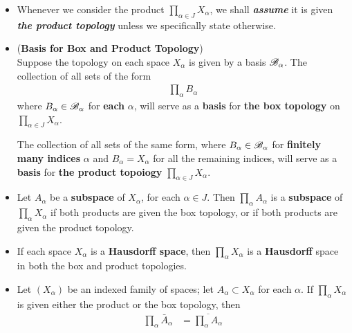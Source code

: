 \documentclass[11pt]{article}
\begin{document}
\begin{itemize}
\item \begin{remark}
Whenever we consider the product $\prod_{\alpha \in J} X_{\alpha}$, we shall \emph{\textbf{assume}} it is given \emph{\textbf{the product topology}} unless we specifically state otherwise.
\end{remark}

\item \begin{proposition} (\textbf{Basis for Box and Product Topology})\\
Suppose the topology on each space $X_{\alpha}$ is given by a basis  ${\mathscr B}_{\alpha}$. The collection of all sets of the form
\begin{align*}
\prod_{\alpha}B_{\alpha}
\end{align*}
where $B_{\alpha} \in {\mathscr B}_{\alpha}$ for \textbf{each} $\alpha$, will serve as a \textbf{basis} for \textbf{the box topology} on $\prod_{\alpha \in J} X_{\alpha}$.

The collection of all sets of the same form, where $B_{\alpha} \in {\mathscr B}_{\alpha}$ for \textbf{finitely many indices} $\alpha$ and $B_{\alpha} = X_{\alpha}$ for all the remaining indices, will serve as a \textbf{basis} for \textbf{the product topoiogy} $\prod_{\alpha \in J} X_{\alpha}$.
\end{proposition}

\item \begin{proposition}
Let $A_{\alpha}$ be a \textbf{subspace} of $X_{\alpha}$, for each $\alpha \in J$. Then $\prod_{\alpha}A_{\alpha}$ is a \textbf{subspace} of $\prod_{\alpha}X_{\alpha}$ if both products are given the box topology, or if both products are given the product topology.
\end{proposition}

\item \begin{proposition}
If each space $X_{\alpha}$ is a \textbf{Hausdorff space}, then $\prod_{\alpha}X_{\alpha}$ is a \textbf{Hausdorff} space in both the box and product topologies.
\end{proposition}

\item \begin{proposition}
Let $(X_{\alpha})$ be an indexed family of spaces; let $A_{\alpha} \subset X_{\alpha}$ for each $\alpha$. If $\prod_{\alpha}X_{\alpha}$ is given either the product or the box topology, then
\begin{align*}
\prod_{\alpha}\bar{A}_{\alpha} &= \overline{\prod_{\alpha}A_{\alpha}}
\end{align*}
\end{proposition}


\end{itemize}
\end{document}

